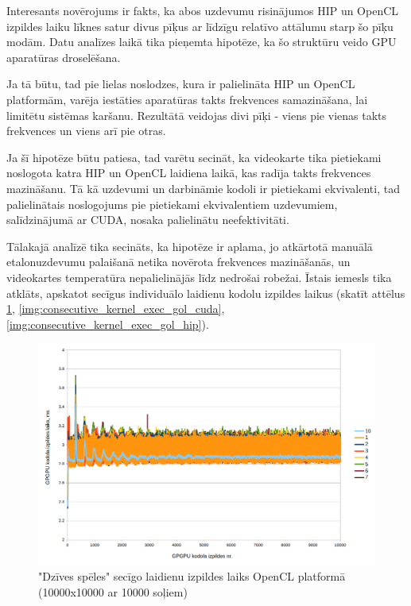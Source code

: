 Interesants novērojums ir fakts, ka abos uzdevumu risinājumos HIP un OpenCL
izpildes laiku līknes satur divus pīķus ar līdzīgu relatīvo attālumu starp šo
pīķu modām. Datu analīzes laikā tika pieņemta hipotēze, ka šo struktūru veido
GPU aparatūras droselēšana.

Ja tā būtu, tad pie lielas noslodzes, kura ir palielināta HIP un OpenCL
platformām, varēja iestāties aparatūras takts frekvences samazināšana, lai
limitētu sistēmas karšanu. Rezultātā veidojas divi pīķi - viens pie vienas
takts frekvences un viens arī pie otras.

Ja šī hipotēze būtu patiesa, tad varētu secināt, ka videokarte tika pietiekami
noslogota katra HIP un OpenCL laidiena laikā, kas radīja takts frekvences
mazināšanu. Tā kā uzdevumi un darbināmie kodoli ir pietiekami ekvivalenti, tad
palielinātais noslogojums pie pietiekami ekvivalentiem uzdevumiem,
salīdzinājumā ar CUDA, nosaka palielinātu neefektivitāti.

Tālakajā analīzē tika secināts, ka hipotēze ir aplama, jo atkārtotā manuālā
etalonuzdevumu palaišanā netika novērota frekvences mazināšanās, un videokartes
temperatūra nepalielinājās līdz nedrošai robežai. Īstais iemesls tika
atklāts, apskatot secīgus individuālo laidienu kodolu izpildes laikus (skatīt
attēlus \ref{img:consecutive_kernel_exec_gol_cl},
\ref{img:consecutive_kernel_exec_gol_cuda},
\ref{img:consecutive_kernel_exec_gol_hip}).

\begin{figure}[H] \centering
    \includegraphics[width=\textwidth]{images/gol_opencl_consecutive_runs_10k_by_10k_10ksteps.png}
    \caption{"Dzīves spēles" secīgo laidienu izpildes laiks OpenCL
    platformā (10000x10000 ar 10000 soļiem)}
    \label{img:consecutive_kernel_exec_gol_cl}
\end{figure}


